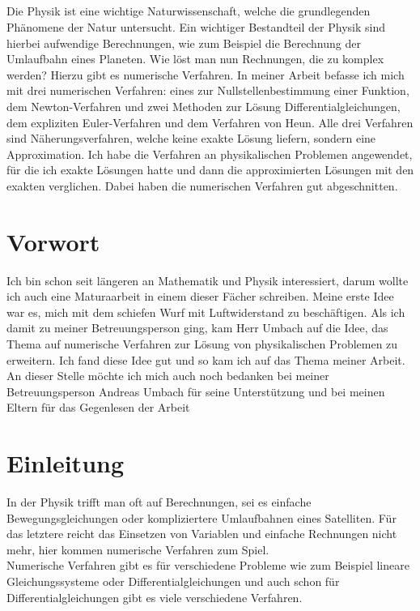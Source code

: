 \documentclass[a4paper,12pt]{report}
\makeatletter
\renewenvironment{abstract}{%
    \if@twocolumn
      \section*{\abstractname}%
    \else %
      \begin{center}%
        {\bfseries \LARGE\abstractname\vspace{\z@}}%
      \end{center}%
      \quotation
    \fi}
    {\if@twocolumn\else\endquotation\fi}
\makeatother
\begin{document}

\begin{abstract}
\noindent
Die Physik ist eine wichtige Naturwissenschaft, welche die grundlegenden Phänomene der Natur untersucht. Ein wichtiger Bestandteil der Physik sind hierbei aufwendige Berechnungen, wie zum Beispiel die Berechnung der Umlaufbahn eines Planeten. Wie löst man nun Rechnungen, die zu komplex werden? Hierzu gibt es numerische Verfahren. In meiner Arbeit befasse ich mich mit drei numerischen Verfahren: eines zur Nullstellenbestimmung einer Funktion, dem Newton-Verfahren und zwei Methoden zur Lösung Differentialgleichungen, dem expliziten Euler-Verfahren und dem Verfahren von Heun. Alle drei Verfahren sind Näherungsverfahren, welche keine exakte Lösung liefern, sondern eine Approximation. Ich habe die Verfahren an physikalischen Problemen angewendet, für die ich exakte Lösungen hatte und dann die approximierten Lösungen mit den exakten verglichen. Dabei haben die numerischen Verfahren gut abgeschnitten. 
\end{abstract}
\tableofcontents


\chapter{Vorwort}
Ich bin schon seit längeren an Mathematik und Physik interessiert, darum wollte ich auch eine Maturaarbeit in einem dieser Fächer schreiben. Meine erste Idee war es, mich mit dem schiefen Wurf mit Luftwiderstand zu beschäftigen. Als ich damit zu meiner Betreuungsperson ging, kam Herr Umbach auf die Idee, das Thema auf numerische Verfahren zur Lösung von physikalischen Problemen zu erweitern. Ich fand diese Idee gut und so kam ich auf das Thema meiner Arbeit. An dieser Stelle möchte ich mich auch noch bedanken bei  meiner Betreuungsperson Andreas Umbach für seine Unterstützung und  bei meinen Eltern für das Gegenlesen der Arbeit 

\chapter{Einleitung}
In der Physik trifft man oft auf Berechnungen, sei es einfache Bewegungsgleichungen oder kompliziertere Umlaufbahnen eines Satelliten. Für das letztere reicht das Einsetzen von Variablen und einfache Rechnungen nicht mehr, hier kommen numerische Verfahren zum Spiel.\\

\noindent
Numerische Verfahren gibt es für verschiedene Probleme wie zum Beispiel lineare Gleichungssysteme oder Differentialgleichungen und auch schon für Differentialgleichungen gibt es viele verschiedene Verfahren. \\
\end{document}
